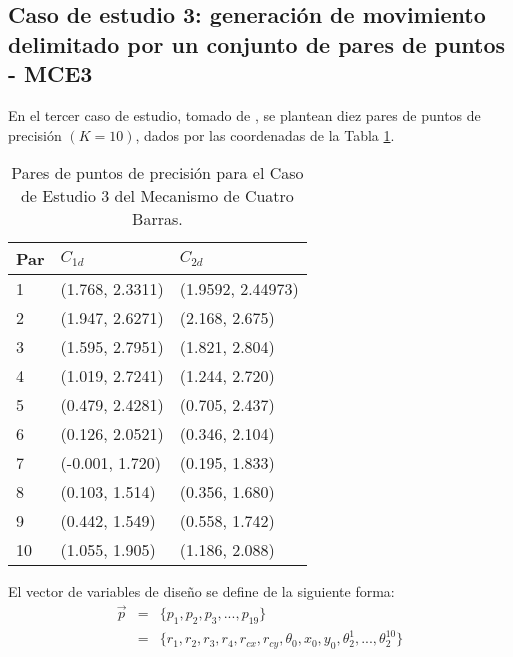 \subsection{Caso de estudio 3: generación de movimiento delimitado por un conjunto de pares de puntos - MCE3}
En el tercer caso de estudio, tomado de \cite{Portilla_Mezura_MEC3}, se plantean diez pares de puntos de precisión $(K = 10)$, dados por las coordenadas de la Tabla \ref{tab:Coordenadas MEC3}.
\begin{table}[htb]
	\centering
	\begin{tabular}{|l|l|l|} 
		\hline
		\textbf{Par}& $C_{1d}$& $C_{2d}$  \\ \hline
		1&  (1.768, 2.3311) &  (1.9592, 2.44973) \\ \hline
		2& (1.947, 2.6271) & (2.168, 2.675)\\ \hline
		3& (1.595, 2.7951) &(1.821, 2.804)\\ \hline
		4& (1.019, 2.7241) &(1.244, 2.720)\\ \hline
		5 &(0.479, 2.4281) &(0.705, 2.437)\\ \hline
		6 &(0.126, 2.0521) &(0.346, 2.104)\\ \hline
		7 &(-0.001, 1.720) &(0.195, 1.833)\\ \hline
		8 &(0.103, 1.514) &(0.356, 1.680)\\ \hline
		9 &(0.442, 1.549) &(0.558, 1.742)\\ \hline
		10& (1.055, 1.905)& (1.186, 2.088)\\ \hline
	\end{tabular}
	\caption{Pares de puntos de precisión para el Caso de Estudio 3 del Mecanismo de Cuatro Barras.}
	\label{tab:Coordenadas MEC3}
\end{table}


 El vector de variables de diseño se define de la siguiente forma:
\begin{eqnarray}\label{eq:Vector variables MEC3}
\vec{p} &=& \{p_1,p_2,p_3,...,p_{19} \}\\
       &=& \{ r_1,r_2,r_3,r_4,r_{cx},r_{cy},\theta_0,x_0,y_0,\theta^1_2,...,\theta^{10}_2 \} 
\end{eqnarray}

